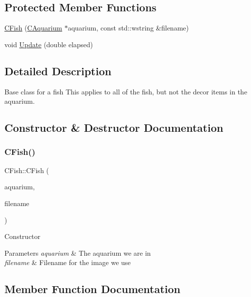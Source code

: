 \subsection*{Protected Member Functions}
\begin{DoxyCompactItemize}
\item 
\mbox{\hyperlink{class_c_fish_a1daf95e31dfa4f045b67ea821b625275}{C\+Fish}} (\mbox{\hyperlink{class_c_aquarium}{C\+Aquarium}} $\ast$aquarium, const std\+::wstring \&filename)
\item 
void \mbox{\hyperlink{class_c_fish_a1f32288b28d3c1f186bd51cf8ac71aeb}{Update}} (double elapsed)
\end{DoxyCompactItemize}


\subsection{Detailed Description}
Base class for a fish This applies to all of the fish, but not the decor items in the aquarium. 

\subsection{Constructor \& Destructor Documentation}
\mbox{\label{class_c_fish_a1daf95e31dfa4f045b67ea821b625275}} 
\subsubsection{\texorpdfstring{C\+Fish()}{CFish()}}
{\footnotesize\ttfamily C\+Fish\+::\+C\+Fish (\begin{DoxyParamCaption}\item[{\mbox{\hyperlink{class_c_aquarium}{C\+Aquarium}} $\ast$}]{aquarium,  }\item[{const std\+::wstring \&}]{filename }\end{DoxyParamCaption})\hspace{0.3cm}{\ttfamily [protected]}}

Constructor 
\begin{DoxyParams}{Parameters}
{\em aquarium} & The aquarium we are in \\
\hline
{\em filename} & Filename for the image we use \\
\hline
\end{DoxyParams}


\subsection{Member Function Documentation}
\mbox{\label{class_c_fish_ab3d626359c6bcbb020583ddd19032447}} 

